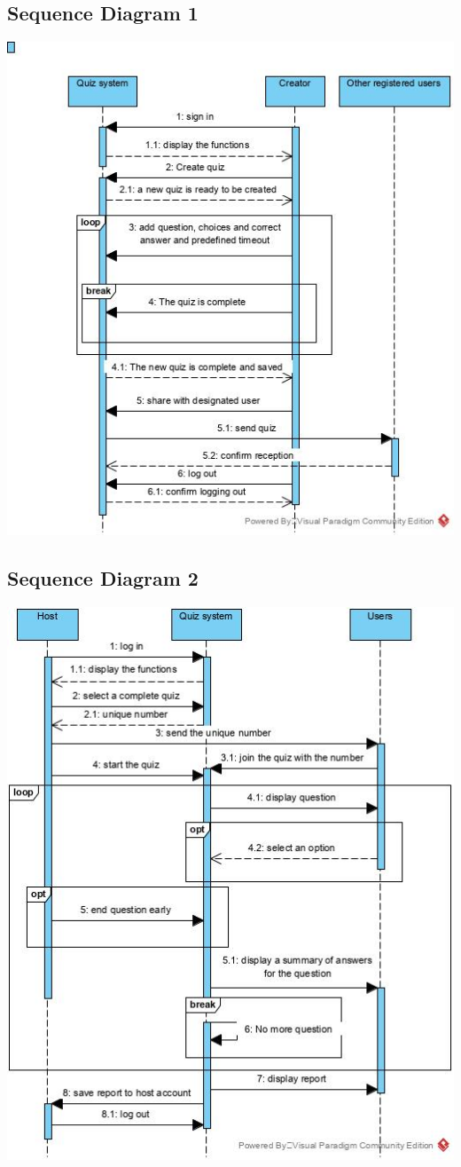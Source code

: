 \documentclass[a4paper]{article}
\begin{document}
	\subsection{Sequence Diagram 1}
	\includegraphics[scale=1]{Sequence_Diagram1}
	\subsection{Sequence Diagram 2}
	\includegraphics[scale=1]{Sequence_Diagram2}
	
\end{document}
